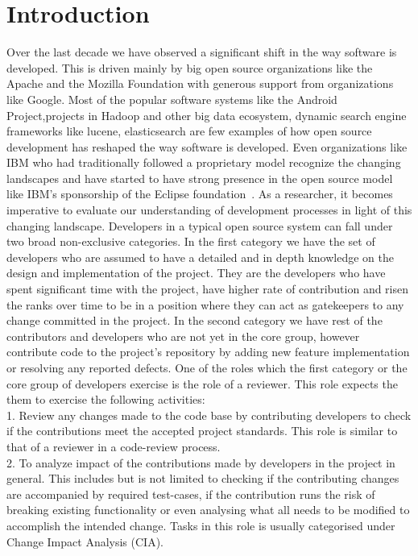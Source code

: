 
\section{Introduction}
\label{sec:intro}

Over the last decade we have observed a significant shift in the way software is developed. This is driven mainly by big open source organizations like the Apache and the Mozilla Foundation with generous support from organizations like Google. Most of the popular software systems like the Android Project,projects in Hadoop and other big data ecosystem, dynamic search engine frameworks like lucene, elasticsearch are few examples of how open source development has reshaped the way software is developed. Even organizations like IBM who had traditionally followed a proprietary model recognize the changing landscapes and have started to have strong presence in the open source model like IBM's sponsorship of the Eclipse foundation~\cite{Eclipse}. As a researcher, it becomes imperative to evaluate our understanding of development processes in light of this changing landscape.
Developers in a typical open source system can fall under two broad non-exclusive categories. In the first category we have the set of developers who are assumed to have a detailed and in depth knowledge on the design and implementation of the project. They are the developers who have spent significant time with the project, have higher rate of contribution and risen the ranks over time to be in a position where they can act as gatekeepers to any change committed in the project. In the second category we have rest of the contributors and developers who are not yet in the core group, however contribute code to the project's  repository by adding new feature implementation or resolving any reported defects. One of the roles which the first category or the core group of developers exercise is the role of a reviewer. This role expects the them to exercise the following activities:\\
1. Review any changes made to the code base by contributing developers to check if the contributions meet the accepted project standards. This role is similar to that of a reviewer in a code-review process.\\
2. To analyze impact of the contributions made by developers in the project in general. This includes but is not limited to checking if the contributing changes are accompanied by required test-cases, if the contribution runs the risk of breaking existing functionality or even analysing what all needs to be modified to accomplish the intended change. Tasks in this role is usually categorised under Change Impact Analysis (CIA).~\cite{STVSTVR1475} \\
